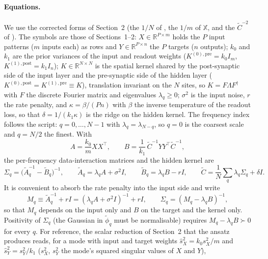 \documentclass[11pt,a4paper]{article}
\newcommand{\R}{\mathbb R}
\newcommand{\Ct}{\tilde C}
\newcommand{\At}{\tilde A}
\newcommand{\Bt}{\tilde B}
\begin{document}
\paragraph{Equations.}
We use the corrected forms of Section~2 (the $1/N$ of , the $1/m$ of $\mathbb X$, and the $\Ct^{-2}$ of ). The symbols are those of Sections~1--2: $X \in \R^{P\times m}$ holds the $P$ input patterns ($m$ inputs each) as rows and $Y \in \R^{P\times n}$ the $P$ targets ($n$ outputs); $k_0$ and $k_1$ are the prior variances of the input and readout weights ($K^{(0),\mathrm{pre}} = k_0 I_m$, $K^{(1),\mathrm{post}} = k_1 I_n$); $K \in \R^{N\times N}$ is the spatial kernel shared by the post-synaptic side of the input layer and the pre-synaptic side of the hidden layer ($K^{(0),\mathrm{post}} = K^{(1),\mathrm{pre}} \equiv K$), translation invariant on the $N$ sites, so $K = F\Lambda F^\dagger$ with $F$ the discrete Fourier matrix and eigenvalues $\lambda_q \ge 0$; $\sigma^2$ is the input noise, $r$ the rate penalty, and $\kappa = \beta/(Pn)$ with $\beta$ the inverse temperature of the readout loss, so that $\delta = 1/(k_1\kappa)$ is the ridge on the hidden kernel. The frequency index follows the script: $q = 0,\dots,N-1$ with $\lambda_q = \lambda_{N-q}$, so $q = 0$ is the coarsest scale and $q = N/2$ the finest. With
\begin{equation}
  A = \frac{k_0}{m} XX^\top, \qquad
  B = \frac{1}{k_1}\,\Ct^{-1} YY^\top \Ct^{-1},
\end{equation}
the per-frequency data-interaction matrices and the hidden kernel are
\begin{equation}
  \Sigma_q = \big(\At_q^{-1} - \Bt_q\big)^{-1}, \qquad
  \At_q = \lambda_q A + \sigma^2 I, \qquad
  \Bt_q = \lambda_q B - r I, \qquad
  \Ct = \frac1N\sum_q \lambda_q \Sigma_q + \delta I .
  \label{eq:fixed-point}
\end{equation}
It is convenient to absorb the rate penalty into the input side and write
\begin{equation}
  M_q \equiv \At_q^{-1} + r I = (\lambda_q A + \sigma^2 I)^{-1} + r I,
  \qquad
  \Sigma_q = (M_q - \lambda_q B)^{-1},
  \label{eq:Mq}
\end{equation}
so that $M_q$ depends on the input only and $B$ on the target and the kernel only. Positivity of $\Sigma_q$ (the Gaussian in $\tilde\phi_q$ must be normalisable) requires $M_q - \lambda_q B \succ 0$ for every $q$.
For reference, the scalar reduction of Section~2 that the ansatz produces reads, for a mode with input and target weights $\hat s_X^2 = k_0 s_X^2/m$ and $\hat s_Y^2 = s_Y^2/k_1$ ($s_X^2$, $s_Y^2$ the mode's squared singular values of $X$ and $Y$),
\end{document}
